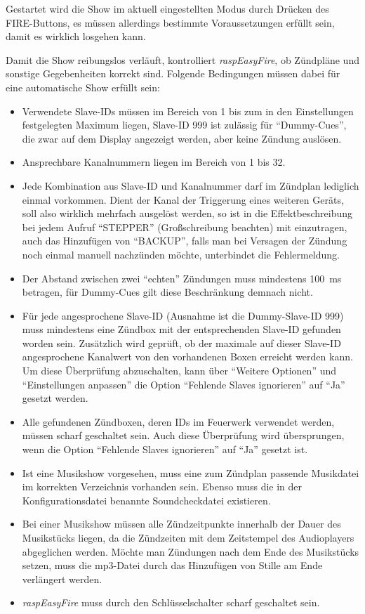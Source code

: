 \documentclass[paper=a4, parskip, numbers=noenddot, toc=listof, headsepline]{scrbook}
\newcommand{\REF}{\emph{raspEasyFire}}
\begin{document}
				Gestartet wird die Show im aktuell eingestellten Modus durch Drücken des FIRE-Buttons, es müssen allerdings bestimmte Voraussetzungen erfüllt sein, damit es wirklich losgehen kann.

				Damit die Show reibungslos verläuft, kontrolliert {\REF}, ob Zündpläne und sonstige Gegebenheiten korrekt sind. Folgende Bedingungen müssen dabei für eine automatische Show erfüllt sein:
				\begin{itemize}
					\item
					      Verwendete Slave-IDs müssen im Bereich von 1 bis zum in den Einstellungen festgelegten Maximum liegen, Slave-ID 999 ist zulässig für \enquote{Dummy-Cues}, die zwar auf dem Display angezeigt werden, aber keine Zündung auslösen.
					\item
					      Ansprechbare Kanalnummern liegen im Bereich von 1 bis 32.
					\item
					      Jede Kombination aus Slave-ID und Kanalnummer darf im Zündplan lediglich einmal vorkommen. Dient der Kanal der Triggerung eines weiteren Geräts, soll also wirklich mehrfach ausgelöst werden, so ist in die Effektbeschreibung bei jedem Aufruf \enquote{STEPPER} (Großschreibung beachten) mit einzutragen, auch das Hinzufügen von \enquote{BACKUP}, falls man bei Versagen der Zündung noch einmal manuell nachzünden möchte, unterbindet die Fehlermeldung.
					\item
					      Der Abstand zwischen zwei \enquote{echten} Zündungen muss mindestens \SI{100}{\milli\second} betragen, für Dummy-Cues gilt diese Beschränkung demnach nicht.
					\item
					      Für jede angesprochene Slave-ID (Ausnahme ist die Dummy-Slave-ID 999) muss mindestens eine Zündbox mit der entsprechenden Slave-ID gefunden worden sein. Zusätzlich wird geprüft, ob der maximale auf dieser Slave-ID angesprochene Kanalwert von den vorhandenen Boxen erreicht werden kann. Um diese Überprüfung abzuschalten, kann über \enquote{Weitere Optionen} und \enquote{Einstellungen anpassen} die Option \enquote{Fehlende Slaves ignorieren} auf \enquote{Ja} gesetzt werden.
					\item
					      Alle gefundenen Zündboxen, deren IDs im Feuerwerk verwendet werden, müssen scharf geschaltet sein. Auch diese Überprüfung wird übersprungen, wenn die Option \enquote{Fehlende Slaves ignorieren} auf \enquote{Ja} gesetzt ist.
					\item
					      Ist eine Musikshow vorgesehen, muss eine zum Zündplan passende Musikdatei im korrekten Verzeichnis vorhanden sein. Ebenso muss die in der Konfigurationsdatei benannte Soundcheckdatei existieren.
					\item
					      Bei einer Musikshow müssen alle Zündzeitpunkte innerhalb der Dauer des Musikstücks liegen, da die Zündzeiten mit dem Zeitstempel des Audioplayers abgeglichen werden. Möchte man Zündungen nach dem Ende des Musikstücks setzen, muss die mp3-Datei durch das Hinzufügen von Stille am Ende verlängert werden.
					\item
					      {\REF} muss durch den Schlüsselschalter scharf geschaltet sein.
				\end{itemize}
\end{document}

